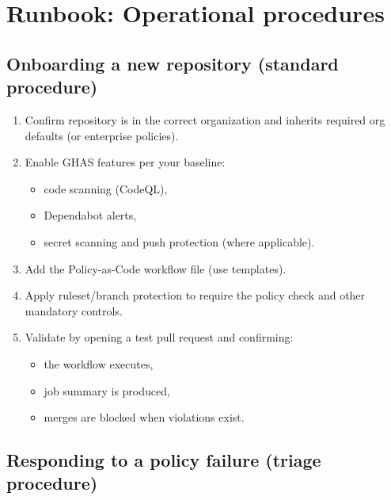 \documentclass[11pt]{article}
\begin{document}
\section{Runbook: Operational procedures}

\subsection{Onboarding a new repository (standard procedure)}

\begin{enumerate}[leftmargin=*]
  \item Confirm repository is in the correct organization and inherits required org defaults (or enterprise policies).
  \item Enable GHAS features per your baseline:
    \begin{itemize}
      \item code scanning (CodeQL),
      \item Dependabot alerts,
      \item secret scanning and push protection (where applicable).
    \end{itemize}
  \item Add the Policy-as-Code workflow file (use templates).
  \item Apply ruleset/branch protection to require the policy check and other mandatory controls.
  \item Validate by opening a test pull request and confirming:
    \begin{itemize}
      \item the workflow executes,
      \item job summary is produced,
      \item merges are blocked when violations exist.
    \end{itemize}
\end{enumerate}

\subsection{Responding to a policy failure (triage procedure)}
\end{document}
